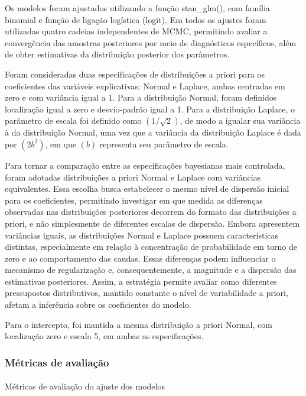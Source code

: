 \documentclass[
  brazilian,
  12pt,
  letterpaper,
  DIV=11,
  numbers=noendperiod]{scrartcl}
\makeatletter
\let\oldparagraph\paragraph
\renewcommand{\paragraph}{
    \@ifstar
      \xxxParagraphStar
      \xxxParagraphNoStar
  }
\newcommand{\xxxParagraphStar}[1]{\oldparagraph*{#1}\mbox{}}
\newcommand{\xxxParagraphNoStar}[1]{\oldparagraph{#1}\mbox{}}
\makeatother
\begin{document}
Os modelos foram ajustados utilizando a função stan\_glm(), com família
binomial e função de ligação logística (logit). Em todos os ajustes
foram utilizadas quatro cadeias independentes de MCMC, permitindo
avaliar a convergência das amostras posteriores por meio de diagnósticos
específicos, além de obter estimativas da distribuição posterior dos
parâmetros.

Foram consideradas duas especificações de distribuições a priori para os
coeficientes das variáveis explicativas: Normal e Laplace, ambas
centradas em zero e com variância igual a 1. Para a distribuição Normal,
foram definidos localização igual a zero e desvio-padrão igual a 1. Para
a distribuição Laplace, o parâmetro de escala foi definido como
\((1/\sqrt{2})\), de modo a igualar sua variância à da distribuição
Normal, uma vez que a variância da distribuição Laplace é dada por
\((2b^2)\), em que \((b)\) representa seu parâmetro de escala.

Para tornar a comparação entre as especificações bayesianas mais
controlada, foram adotadas distribuições a priori Normal e Laplace com
variâncias equivalentes. Essa escolha busca estabelecer o mesmo nível de
dispersão inicial para os coeficientes, permitindo investigar em que
medida as diferenças observadas nas distribuições posteriores decorrem
do formato das distribuições a priori, e não simplesmente de diferentes
escalas de dispersão. Embora apresentem variâncias iguais, as
distribuições Normal e Laplace possuem características distintas,
especialmente em relação à concentração de probabilidade em torno de
zero e ao comportamento das caudas. Essas diferenças podem influenciar o
mecanismo de regularização e, consequentemente, a magnitude e a
dispersão das estimativas posteriores. Assim, a estratégia permite
avaliar como diferentes pressupostos distributivos, mantido constante o
nível de variabilidade a priori, afetam a inferência sobre os
coeficientes do modelo.

Para o intercepto, foi mantida a mesma distribuição a priori Normal, com
localização zero e escala 5, em ambas as especificações.

\subsubsection{Métricas de
avaliação}\label{muxe9tricas-de-avaliauxe7uxe3o}

\paragraph{Métricas de avaliação do ajuste dos
modelos}\label{muxe9tricas-de-avaliauxe7uxe3o-do-ajuste-dos-modelos}
\end{document}
